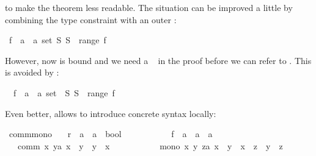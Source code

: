 \begin{isabellebody}
\begin{isamarkuptext}
to make the theorem less readable. The situation can be improved a
little by combining the type constraint with an outer \isa{{\isasymAnd}}:%
\end{isamarkuptext}%
\isamarkuptrue%
\ {\isachardoublequote}{\isasymAnd}f\ {\isacharcolon}{\isacharcolon}\ {\isacharprime}a\ {\isasymRightarrow}\ {\isacharprime}a\ set{\isachardot}\ {\isasymexists}S{\isachardot}\ S\ {\isasymnotin}\ range\ f{\isachardoublequote}\isamarkupfalse%
\isamarkupfalse%
%
\begin{isamarkuptext}%
\noindent However, now  is bound and we need a
~ in the proof before we can refer to .
This is avoided by :%
\end{isamarkuptext}%
\isamarkuptrue%
\ \ f\ {\isacharcolon}{\isacharcolon}\ {\isachardoublequote}{\isacharprime}a\ {\isasymRightarrow}\ {\isacharprime}a\ set{\isachardoublequote}\ \ {\isachardoublequote}{\isasymexists}S{\isachardot}\ S\ {\isasymnotin}\ range\ f{\isachardoublequote}\isamarkupfalse%
\isamarkupfalse%
%
\begin{isamarkuptext}%
\noindent
Even better,  allows to introduce concrete syntax locally:%
\end{isamarkuptext}%
\isamarkuptrue%
\ comm{\isacharunderscore}mono{\isacharcolon}\isanewline
\ \ \ r\ {\isacharcolon}{\isacharcolon}\ {\isachardoublequote}{\isacharprime}a\ {\isasymRightarrow}\ {\isacharprime}a\ {\isasymRightarrow}\ bool{\isachardoublequote}\ {\isacharparenleft}\ {\isachardoublequote}{\isachargreater}{\isachardoublequote}\ {}{}{\isacharparenright}\ \isanewline
\ \ \ \ \ \ \ f\ {\isacharcolon}{\isacharcolon}\ {\isachardoublequote}{\isacharprime}a\ {\isasymRightarrow}\ {\isacharprime}a\ {\isasymRightarrow}\ {\isacharprime}a{\isachardoublequote}\ \ \ {\isacharparenleft}\ {\isachardoublequote}{\isacharplus}{\isacharplus}{\isachardoublequote}\ {}{}{\isacharparenright}\isanewline
\ \ \ comm{\isacharcolon}\ {\isachardoublequote}{\isasymAnd}x\ y{\isacharcolon}{\isacharcolon}{\isacharprime}a{\isachardot}\ x\ {\isacharplus}{\isacharplus}\ y\ {\isacharequal}\ y\ {\isacharplus}{\isacharplus}\ x{\isachardoublequote}\ \isanewline
\ \ \ \ \ \ \ \ \ \ mono{\isacharcolon}\ {\isachardoublequote}{\isasymAnd}x\ y\ z{\isacharcolon}{\isacharcolon}{\isacharprime}a{\isachardot}\ x\ {\isachargreater}\ y\ {\isasymLongrightarrow}\ x\ {\isacharplus}{\isacharplus}\ z\ {\isachargreater}\ y\ {\isacharplus}{\isacharplus}\ z{\isachardoublequote}\isanewline

\end{isabellebody}
